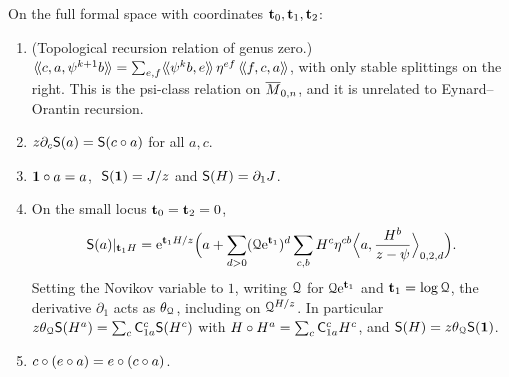 \begin{prop}
\label{prop:gen-qde}
On the full formal space with coordinates $\mathbf{t}_0,\mathbf{t}_1,\mathbf{t}_2$:
\begin{enumerate}
\item (Topological recursion relation of genus zero.) $\langle\!\langle c,a,\psi^{k+1}b \rangle\!\rangle=\sum_{e,f}\langle\!\langle \psi^kb,e \rangle\!\rangle\,\eta^{ef}\,\langle\!\langle f,c,a \rangle\!\rangle$, with only stable splittings on the right. This is the psi-class relation on $\overline{M}_{0,n}$, and it is unrelated to Eynard--Orantin recursion.
\item $z\partial_c\mathsf{S}(a)=\mathsf{S}(c\circ a)$ for all $a,c$.
\item $\mathbf{1}\circ a=a$, $\ \mathsf{S}(\mathbf{1})=J/z$ and $\mathsf{S}(H)=\partial_1J$.
\item On the small locus $\mathbf{t}_0=\mathbf{t}_2=0$,
\[
\mathsf{S}(a)|_{\mathbf{t}_1H}=\mathrm{e}^{\mathbf{t}_1H/z}\Big(a+\sum_{d>0}(\mathcal{Q}\mathrm{e}^{\mathbf{t}_1})^d\sum_{c,b}H^c\eta^{cb}\Big\langle a,\frac{H^b}{z-\psi}\Big\rangle_{0,2,d}\Big).
\]
Setting the Novikov variable to $1$, writing $\mathcal{Q}$ for $\mathcal{Q}\mathrm{e}^{\mathbf{t}_1}$ and $\mathbf{t}_1=\log\mathcal{Q}$, the derivative $\partial_1$ acts as $\theta_{\mathcal{Q}}$, including on $\mathcal{Q}^{H/z}$. In particular $z\theta_{\mathcal{Q}}\mathsf{S}(H^a)=\sum_c\mathsf{C}^c_{1a}\mathsf{S}(H^c)$ with $H\circ H^a=\sum_c\mathsf{C}^c_{1a}H^c$, and $\mathsf{S}(H)=z\theta_{\mathcal{Q}}\mathsf{S}(\mathbf{1})$.
\item $c\circ(e\circ a)=e\circ(c\circ a)$.
\end{enumerate}
\end{prop}
